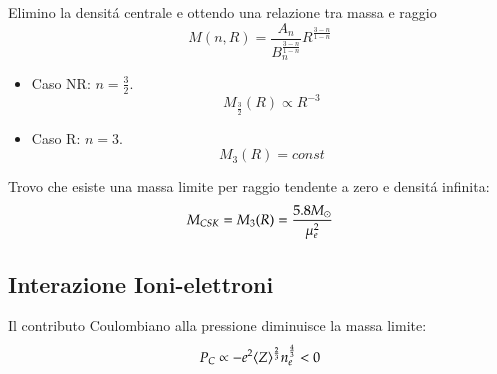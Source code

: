 \documentclass[main.tex]{subfiles}
\begin{document}
Elimino la densit\'a centrale e ottendo una relazione tra massa e raggio
\begin{equation*}
M(n,R)=\frac{A_n}{B_n^{\frac{3-n}{1-n}}}R^{\frac{3-n}{1-n}}
\end{equation*}

\begin{itemize}
\item Caso NR: $n=\frac{3}{2}$.
\begin{equation*}
M_{\frac{3}{2}}(R)\propto R^{-3}
\end{equation*}
\item Caso R: $n=3$.
\begin{equation*}
M_3(R)=const
\end{equation*}
\end{itemize}

Trovo che esiste una massa limite per raggio tendente a zero e densit\'a infinita:
\begin{equation*}
M_{CSK}=M_3(R)=\frac{5.8M_{\odot}}{\mu_e^2}
\end{equation*}

\subsection{Interazione Ioni-elettroni}
Il contributo Coulombiano alla pressione diminuisce la massa limite:
\begin{equation*}
P_C\propto-e^2\langle Z \rangle^{\frac{2}{3}}n_e^{\frac{4}{3}}<0
\end{equation*}

%
\end{document}
